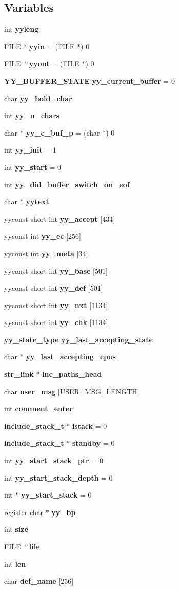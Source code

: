 \subsection*{Variables}
\begin{CompactItemize}
\item 
int {\bf yyleng}
\item 
FILE $\ast$ {\bf yyin} = (FILE $\ast$) 0
\item 
FILE $\ast$ {\bf yyout} = (FILE $\ast$) 0
\item 
{\bf YY\_\-BUFFER\_\-STATE} {\bf yy\_\-current\_\-buffer} = 0
\item 
char {\bf yy\_\-hold\_\-char}
\item 
int {\bf yy\_\-n\_\-chars}
\item 
char $\ast$ {\bf yy\_\-c\_\-buf\_\-p} = (char $\ast$) 0
\item 
int {\bf yy\_\-init} = 1
\item 
int {\bf yy\_\-start} = 0
\item 
int {\bf yy\_\-did\_\-buffer\_\-switch\_\-on\_\-eof}
\item 
char $\ast$ {\bf yytext}
\item 
yyconst short int {\bf yy\_\-accept} [434]
\item 
yyconst int {\bf yy\_\-ec} [256]
\item 
yyconst int {\bf yy\_\-meta} [34]
\item 
yyconst short int {\bf yy\_\-base} [501]
\item 
yyconst short int {\bf yy\_\-def} [501]
\item 
yyconst short int {\bf yy\_\-nxt} [1134]
\item 
yyconst short int {\bf yy\_\-chk} [1134]
\item 
{\bf yy\_\-state\_\-type} {\bf yy\_\-last\_\-accepting\_\-state}
\item 
char $\ast$ {\bf yy\_\-last\_\-accepting\_\-cpos}
\item 
{\bf str\_\-link} $\ast$ {\bf inc\_\-paths\_\-head}
\item 
char {\bf user\_\-msg} [USER\_\-MSG\_\-LENGTH]
\item 
int {\bf comment\_\-enter}
\item 
{\bf include\_\-stack\_\-t} $\ast$ {\bf istack} = 0
\item 
{\bf include\_\-stack\_\-t} $\ast$ {\bf standby} = 0
\item 
int {\bf yy\_\-start\_\-stack\_\-ptr} = 0
\item 
int {\bf yy\_\-start\_\-stack\_\-depth} = 0
\item 
int $\ast$ {\bf yy\_\-start\_\-stack} = 0
\item 
register char $\ast$ {\bf yy\_\-bp}
\item 
int {\bf size}
\item 
FILE $\ast$ {\bf file}
\item 
int {\bf len}
\item 
char {\bf def\_\-name} [256]
\end{CompactItemize}


